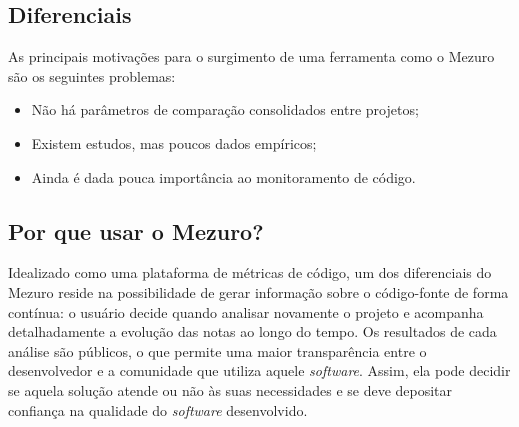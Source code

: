 \documentclass[12pt]{article}
\begin{document}
  \subsection{Diferenciais} \label{subsec:motivacao}
  As principais motivações para o surgimento de uma ferramenta como o Mezuro são os seguintes problemas:
  \begin{itemize}
      \item Não há parâmetros de comparação consolidados entre projetos;
      \item Existem estudos, mas poucos dados empíricos;
      \item Ainda é dada pouca importância ao monitoramento de código.
  \end{itemize}

  \subsection{Por que usar o Mezuro?} \label{sec:projeto-mezuro}
  Idealizado como uma plataforma de métricas de código, um dos diferenciais do Mezuro reside na possibilidade de gerar informação sobre o código-fonte de forma contínua: o usuário decide quando analisar novamente o projeto e acompanha detalhadamente a evolução das notas ao longo do tempo. Os resultados de cada análise são públicos, o que permite uma maior transparência entre o desenvolvedor e a comunidade que utiliza aquele \textit{software}. Assim, ela pode decidir se aquela solução atende ou não às suas necessidades e se deve depositar confiança na qualidade do \textit{software} desenvolvido.
\end{document}
